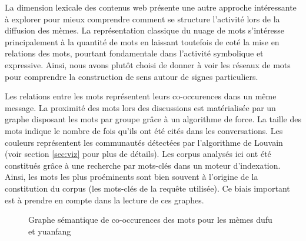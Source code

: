 La dimension lexicale des contenus web présente une autre approche intéressante \`a explorer pour mieux comprendre comment se structure l{\textquoteright}activité lors de la diffusion des mèmes. La représentation classique du nuage de mots s{\textquoteright}intéresse principalement \`a la quantité de mots en laissant toutefois de coté la mise en relations des mots, pourtant fondamentale dans l{\textquoteright}activité symbolique et expressive. Ainsi, nous avons plut\^ot choisi de donner à voir les réseaux de mots pour comprendre la construction de sens autour de signes particuliers. 

Les relations entre les mots représentent leurs co-occurences dans un même message. La proximité des mots lors des discussions est matérialisée par un graphe disposant les mots par groupe grâce à un algorithme de force. La taille des mots indique le nombre de fois qu'ils ont été cités dans les conversations. Les couleurs représentent les communautés détectées par l'algorithme de Louvain \citep{Blondel2008} (voir section \ref{sec:viz} pour plus de détails). Les corpus analysés ici ont été constitués grâce \`a une recherche par mots-clés dans un moteur d{\textquoteright}indexation. Ainsi, les mots les plus proéminents sont bien souvent \`a l{\textquoteright}origine de la constitution du corpus (les mots-clés de la requête utilisée). Ce biais important est \`a prendre en compte dans la lecture de ces graphes.

\begin{figure}[htbp]
    \centering
    
  \caption{
    Graphe sémantique de co-occurences des mots pour les mèmes dufu et yuanfang   
  }
\end{figure}

